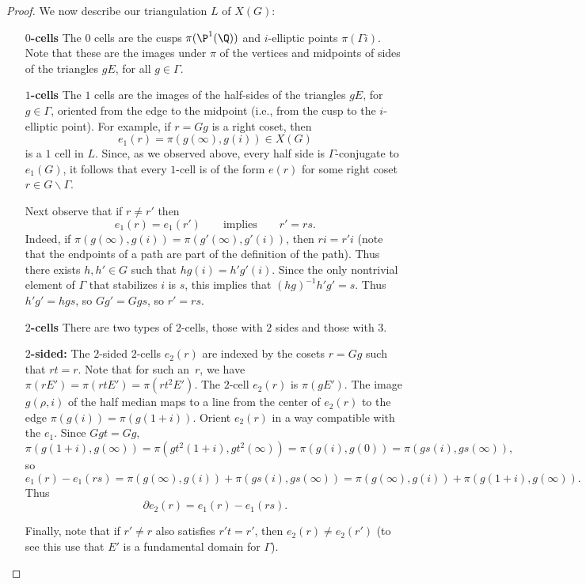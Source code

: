\documentclass{report}
\begin{document}
\begin{proof}
We now describe our triangulation $L$ of $X(G)$:
\begin{itemize}
\item[\bf $0$-cells] The $0$ cells are the cusps $\pi(\P^1(\Q))$
and $i$-elliptic points $\pi(\Gamma{}i)$.  Note that these are the
images under $\pi$ of the vertices and midpoints of sides of the
triangles $gE$, for all $g\in\Gamma$.
%

\item[\bf $1$-cells] The $1$ cells are the images of the
half-sides of the triangles $gE$, for $g\in\Gamma$, oriented from
the edge to the midpoint (i.e., from the cusp to the $i$-elliptic
point).  For example, if $r=Gg$ is a right coset, then
\[
  e_1(r) = \pi(g(\infty),g(i))\in X(G)
\]
is a $1$ cell in $L$.  Since, as we observed above, every half
side is $\Gamma$-conjugate to $e_1(G)$, it follows that every
$1$-cell is of the form $e(r)$ for some right coset
$r\in{}G\backslash \Gamma$.

Next observe that if $r\neq r'$ then
\begin{equation}\label{eqn:differentcycles}
e_1(r)=e_1(r') \qquad \text{implies}\qquad r'=rs.
\end{equation}
Indeed, if $\pi(g(\infty),g(i)) = \pi(g'(\infty),g'(i))$, then
$ri=r'i$ (note that the endpoints of a path are part of the
definition of the path).  Thus there exists $h, h'\in G$ such that
$hg(i) = h'g'(i)$.  Since the only nontrivial element of $\Gamma$
that stabilizes $i$ is $s$, this implies that $(hg)^{-1} h'g' =
s$. Thus $h'g'=hgs$, so $Gg'=Ggs$, so $r'=rs$.
%

\item[\bf $2$-cells] There are two types of $2$-cells, those with
$2$ sides and those with $3$.

{\bf $2$-sided:} The $2$-sided $2$-cells $e_2(r)$ are indexed by
the cosets $r=Gg$ such that $rt=r$.  Note that for such an~$r$, we
have $\pi(rE')=\pi(rtE')=\pi(rt^2E')$. The $2$-cell $e_2(r)$ is
$\pi( g E')$.  The image  $g(\rho,i)$ of the half median maps to a
line from the center of $e_2(r)$ to the edge
$\pi(g(i))=\pi(g(1+i))$.  Orient $e_2(r)$ in a way compatible with
the $e_1$.  Since $Ggt=Gg$,
\[
  \pi(g(1+i),g(\infty)) = \pi(gt^2(1+i),gt^2(\infty)) =
  \pi(g(i),g(0)) = \pi(gs(i),gs(\infty)),
\]
so
\[ e_1(r) - e_1(rs)
   = \pi(g(\infty),g(i)) + \pi(gs(i),gs(\infty))
   = \pi(g(\infty),g(i)) + \pi(g(1+i),g(\infty)).
\]
Thus $$\partial e_2(r) = e_1(r) - e_1(rs).$$

Finally, note that if $r'\neq r$ also satisfies $r't=r'$, then
$e_2(r) \neq e_2(r')$ (to see this use that $E'$ is a fundamental
domain for $\Gamma$).


\end{itemize}
\end{proof}
\end{document}

